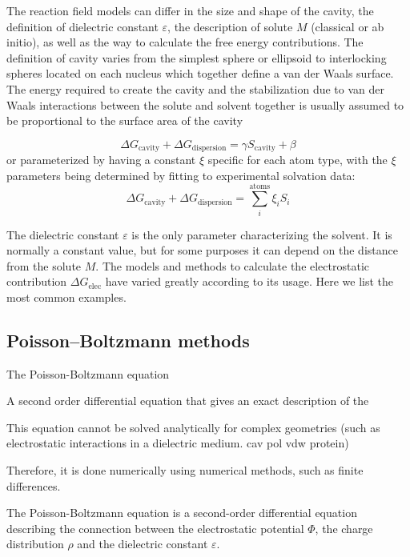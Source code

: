 The reaction field models can differ in the size and shape of the cavity,
the definition of dielectric constant $\varepsilon$, the description
of solute $M$ (classical or ab initio), as well as the way to calculate
the free energy contributions. The definition of cavity varies from
the simplest sphere or ellipsoid to interlocking spheres located on
each nucleus which together define a van der Waals surface. The energy
required to create the cavity and the stabilization due to van der
Waals interactions between the solute and solvent together is usually
assumed to be proportional to the surface area of the cavity

\begin{equation}
\Delta G_{\mathrm{cavity}}+\Delta G_{\mathrm{dispersion}}=\gamma S_{\mathrm{cavity}}+\beta
\end{equation}
or parameterized by having a constant $\xi$ specific for each atom
type, with the $\xi$ parameters being determined by fitting to experimental
solvation data:
\begin{equation}
\Delta G_{\mathrm{cavity}}+\Delta G_{\mathrm{dispersion}}=\sum_{i}^{\mathrm{atoms}}\xi_{i}S_{i}
\end{equation}


The dielectric constant $\varepsilon$ is the only parameter characterizing
the solvent. It is normally a constant value, but for some purposes it can
depend on the distance from the solute $M$. The models and methods
to calculate the electrostatic contribution $\Delta G_{\mathrm{elec}}$
have varied greatly according to its usage. Here we list the most common
examples.


\subsection{Poisson–Boltzmann methods}

The Poisson-Boltzmann equation

A second order differential equation that gives an exact description
of the %

This equation cannot be solved analytically for complex geometries
(such as electrostatic interactions in a dielectric medium. cav
pol vdw protein)

Therefore, it is done numerically using numerical methods, such as
finite differences.

The Poisson-Boltzmann equation is a second-order differential equation describing
the connection between the electrostatic potential $\Phi$, the charge
distribution $\rho$ and the dielectric constant $\varepsilon$.

